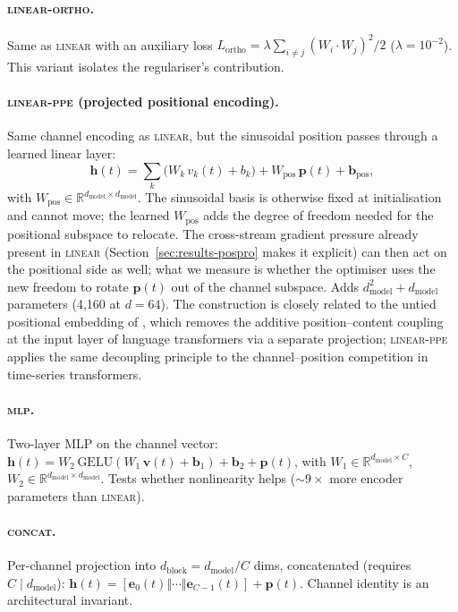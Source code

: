 \documentclass[11pt]{article}
\begin{document}
\paragraph{\textsc{linear-ortho}.} Same as \textsc{linear} with an
auxiliary loss $L_{\text{ortho}} = \lambda \sum_{i \ne j}
(W_i \cdot W_j)^2 / 2$ ($\lambda{=}10^{-2}$). This variant isolates the
regulariser's contribution.

\paragraph{\textsc{linear-ppe} (projected positional encoding).}
Same channel encoding as \textsc{linear}, but the sinusoidal position
passes through a learned linear layer:
\[
  \mathbf{h}(t) = \sum_k \bigl(W_k\,v_k(t) + b_k\bigr)
                + W_{\text{pos}}\,\mathbf{p}(t) + \mathbf{b}_{\text{pos}},
\]
with $W_{\text{pos}} \in \mathbb{R}^{d_{\text{model}} \times
d_{\text{model}}}$. The sinusoidal basis is otherwise fixed at
initialisation and cannot move; the learned $W_{\text{pos}}$ adds
the degree of freedom needed for the positional subspace to
relocate. The cross-stream gradient pressure already present in
\textsc{linear} (Section~\ref{sec:results-pospro} makes it
explicit) can then act on the positional side as well; what we
measure is whether the optimiser uses the new freedom to rotate
$\mathbf{p}(t)$ out of the channel subspace. Adds
$d_{\text{model}}^2 + d_{\text{model}}$ parameters (4{,}160 at
$d{=}64$).
The construction is closely related to the untied positional
embedding of \citet{ke2021rethinking}, which removes the additive
position--content coupling at the input layer of language
transformers via a separate projection; \textsc{linear-ppe} applies
the same decoupling principle to the channel--position competition
in time-series transformers.

\paragraph{\textsc{mlp}.} Two-layer MLP on the channel vector:
$\mathbf{h}(t) = W_2\,\text{GELU}(W_1\,\mathbf{v}(t) + \mathbf{b}_1)
+ \mathbf{b}_2 + \mathbf{p}(t)$, with
$W_1 \in \mathbb{R}^{d_{\text{model}} \times C}$,
$W_2 \in \mathbb{R}^{d_{\text{model}} \times d_{\text{model}}}$.
Tests whether nonlinearity helps (${\sim}9{\times}$ more encoder
parameters than \textsc{linear}).

\paragraph{\textsc{concat}.} Per-channel projection into
$d_{\text{block}} {=} d_{\text{model}}/C$ dims, concatenated
(requires $C \mid d_{\text{model}}$):
$\mathbf{h}(t) = [\mathbf{e}_0(t) \Vert \cdots \Vert
\mathbf{e}_{C-1}(t)] + \mathbf{p}(t)$. Channel identity is an
architectural invariant.
\end{document}
